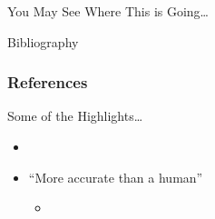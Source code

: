 \documentclass[11pt,dvipsnames,usenames,aspectratio=169]{beamer}  %
\begin{document}
\begin{frame}{You May See Where This is Going\ldots}
  \begin{center}
  \end{center}
\end{frame}

\begin{frame}[allowframebreaks]{Bibliography}
  {\tiny
    \frametitle{References}
    
    
  }
\end{frame}

\begin{frame}{Some of the Highlights\ldots}
  \begin{itemize}
    \item

    \item ``More accurate than a human''~\citep{Dressel:2018}
      \begin{itemize}[<+->]
        \item
      \end{itemize}
  \end{itemize}
\end{frame}

\begin{frame}{}
\end{frame}
\end{document}
